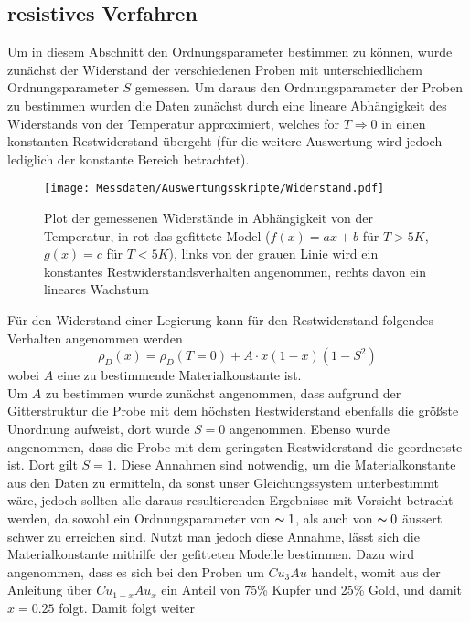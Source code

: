 \subsection{resistives Verfahren}
    Um in diesem Abschnitt den Ordnungsparameter bestimmen zu können, wurde zunächst der Widerstand der verschiedenen Proben mit
    unterschiedlichem Ordnungsparameter $S$ gemessen. Um daraus den Ordnungsparameter der Proben zu bestimmen
    wurden die Daten zunächst durch eine lineare Abhängigkeit des Widerstands von der Temperatur
    approximiert, welches for $T\Rightarrow 0$ in einen konstanten Restwiderstand übergeht (für die weitere Auswertung wird jedoch lediglich der konstante Bereich betrachtet).
    \begin{figure}[H]
        \centering
        \texttt{[image: Messdaten/Auswertungsskripte/Widerstand.pdf]}
        \caption{Plot der gemessenen Widerstände in Abhängigkeit von der Temperatur, in rot das gefittete Model ($f(x)=ax+b$ für $T>5K$, $g(x)=c$ für $T<5K$), links von der grauen Linie wird
        ein konstantes Restwiderstandsverhalten angenommen, rechts davon ein lineares Wachstum}
        \label{resistance plot}
    \end{figure}
    Für den Widerstand einer Legierung kann für den Restwiderstand folgendes Verhalten angenommen werden
    \begin{equation}
        \rho_D(x) = \rho_D(T=0) + A\cdot x(1-x)(1-S^2)
    \end{equation}
    wobei $A$ eine zu bestimmende Materialkonstante ist.\\
    Um $A$ zu bestimmen wurde zunächst angenommen, dass aufgrund der Gitterstruktur die Probe mit dem höchsten
    Restwiderstand ebenfalls die größste Unordnung aufweist, dort wurde $S=0$ angenommen. Ebenso wurde angenommen,
    dass die Probe mit dem geringsten Restwiderstand die geordnetste ist. Dort gilt $S=1$. Diese Annahmen sind
    notwendig, um die Materialkonstante aus den Daten zu ermitteln, da sonst unser Gleichungssystem unterbestimmt wäre,
    jedoch sollten alle daraus resultierenden Ergebnisse mit Vorsicht betracht werden, da sowohl ein Ordnungsparameter
    von $\thicksim 1$, als auch von $\thicksim 0$ äussert schwer zu erreichen sind. Nutzt man jedoch diese Annahme, lässt sich die Materialkonstante
    mithilfe der gefitteten Modelle bestimmen. Dazu wird angenommen, dass es sich bei den Proben um $Cu_3Au$ handelt, womit
    aus der Anleitung über $Cu_{1-x}Au_x$ ein Anteil von 75\% Kupfer und 25\% Gold, und damit $x=0.25$ folgt. Damit folgt weiter
